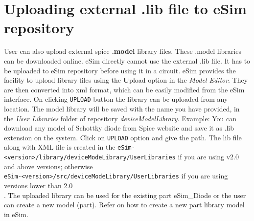 \section{Uploading external .lib file to eSim repository}
User can also upload external spice {\textbf{.model}} library files. These .model libraries can be downloaded online.  eSim directly cannot use the external .lib file. It has to be uploaded to eSim repository before using it in a circuit.
eSim provides the facility to upload library files using the {\textbf Upload} option in the {\textit 
{Model Editor}}. They are then converted into xml format, which can be easily modified from the eSim interface.
On clicking {\tt UPLOAD} button the library can be uploaded from any location. The model library will be saved with the name you have provided, in the \textit {User Libraries} folder of repository \textit{deviceModelLibrary}.
Example: You can download any model of Schottky diode from Spice website and save it as .lib extension on the system. Click on  {\tt UPLOAD} option and give the path. The lib file along with XML file is created in the {\tt eSim-<version>/library/deviceModeLibrary/UserLibraries} if you are using v2.0 \linebreak and above versions; otherwise \\
 {\tt eSim-<version>/src/deviceModeLibrary/UserLibraries} if you are using \linebreak versions lower than 2.0 \\. The uploaded library can be used for the existing part eSim\_Diode or the user can create a new model (part). Refer  on how to create a new part library model in eSim.

